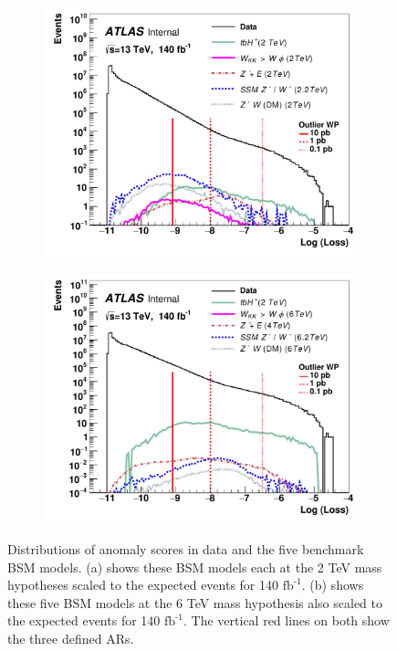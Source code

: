\begin{figure}[ht]
    \centering
    \begin{subfigure}[h]{0.4\linewidth}
    \includegraphics[scale=0.35]{figs/ch6/results/pub_loss_cut_all_sum_run2.pdf}%
    \caption{}
    \end{subfigure}
    \hfill
    \begin{subfigure}[h]{0.4\linewidth}
    \includegraphics[scale=0.35]{figs/ch6/results/pub_loss_cut_all_sum_run3.pdf}%
    \caption{}
    \end{subfigure}
    \hfill
    \caption{Distributions of anomaly scores in data and the five benchmark BSM models. (a) shows these BSM models each at the 2 TeV mass hypotheses scaled to the expected events 
    for 140 $\textrm{fb}^{\textrm{-1}}$. (b) shows these five BSM models at the 6 TeV mass hypothesis also scaled to the expected events 
    for 140 $\textrm{fb}^{\textrm{-1}}$. The vertical red lines on both show the three defined ARs.}
\label{fig:loss-full-data}
\end{figure}

